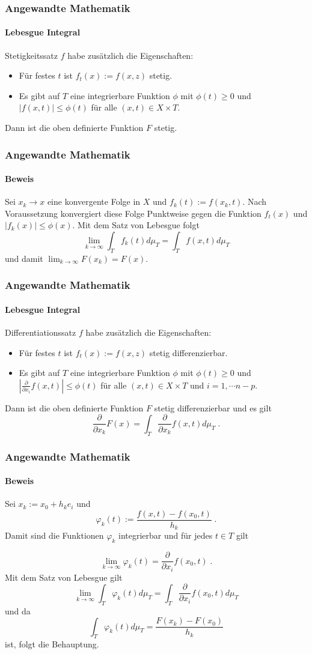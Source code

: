 \documentclass{beamer}
\begin{document}
\begin{frame}
    \frametitle{Angewandte Mathematik}
\framesubtitle{Lebesgue Integral}
\begin{block}{Stetigkeitssatz}
$f$ habe zusätzlich die Eigenschaften:
\begin{itemize}
\item Für festes $t$ ist $f_t(x):= f(x,z)$ stetig.
\item Es gibt auf $T$ eine integrierbare Funktion $\phi$ mit $\phi(t) \geq 0$ und $|f(x,t)| \leq \phi(t)$ für alle $(x,t) \in X \times T$.
\end{itemize}
Dann ist die oben definierte Funktion $F$ stetig. 
\end{block}
 \end{frame}


\begin{frame}
    \frametitle{Angewandte Mathematik}
\framesubtitle{Beweis}
Sei  $x_k \to x$   eine konvergente Folge in $X$ und $f_k(t):= f(x_k,t)$. Nach Voraussetzung konvergiert diese Folge Punktweise gegen die Funktion $f_t(x)$ und $| f_k (x) | \leq \phi(x)$. Mit dem Satz von Lebesgue folgt
$$ \lim_{k \to \infty} \int_T f_k(t) d \mu_T = \int_T f(x,t) d \mu_T$$
und damit $ \lim_{k \to \infty} F(x_k) =  F(x)$.
 \end{frame}

\begin{frame}
    \frametitle{Angewandte Mathematik}
\framesubtitle{Lebesgue Integral}
\begin{block}{Differentiationssatz}
$f$ habe zusätzlich die Eigenschaften:
\begin{itemize}
\item Für festes $t$ ist $f_t(x):= f(x,z)$ stetig differenzierbar.
\item Es gibt auf $T$ eine integrierbare Funktion $\phi$ mit $\phi(t) \geq 0$ und $| \frac{\partial}{\partial x_i} f(x,t)| \leq \phi(t)$ für alle $(x,t) \in X \times T$ und $i=1, \cdots n-p$.
\end{itemize}
Dann ist die oben definierte Funktion $F$ stetig differenzierbar und es gilt
$$\frac{\partial}{\partial x_k} F(x)  = \int_T \frac{\partial}{\partial x_k} f(x,t) d \mu_T \; .$$ 
\end{block}
 \end{frame}

\begin{frame}
    \frametitle{Angewandte Mathematik}
\framesubtitle{Beweis}
Sei $x_k := x_0 + h_k e_i$ und 
$$ \varphi_k (t) := \frac{f(x,t)  - f(x_0,t)  }{h_k} \; .$$
Damit sind die Funktionen  $\varphi_k $ integrierbar und für jedes $t \in T$ gilt

$$  \lim_{k \to \infty} \varphi_k (t) = \frac{\partial}{\partial x_i}f(x_0, t) \; .$$
Mit dem Satz von Lebesgue gilt
$$ \lim_{k \to \infty}  \int_T \varphi_k (t) d \mu_T = \int_T   \frac{\partial}{\partial x_i}f(x_0, t) d \mu_T $$
und da 
$$  \int_T \varphi_k (t) d \mu_T = \frac{F(x_k) -F(x_0)}{h_k}$$ ist, folgt die Behauptung.
 \end{frame}
\end{document}
